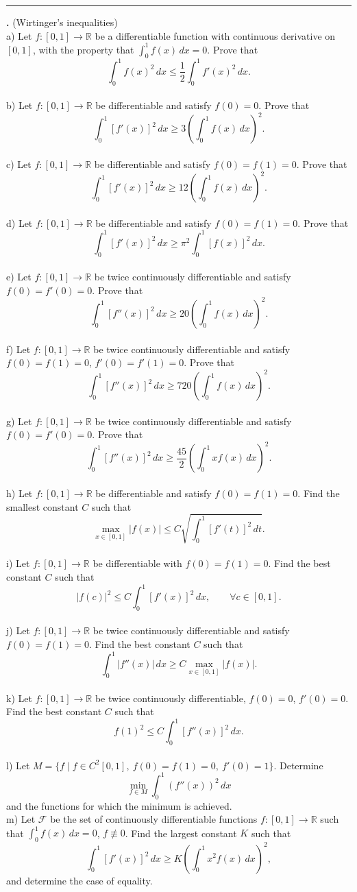 \documentclass[11pt]{article}
\newcounter{probnum}
\newenvironment{problembox}{\par\noindent\rule{\linewidth}{0.5pt}\vspace{5pt}\par}{\vspace{2pt}}
\begin{document}
\begin{problembox}
\textbf{\theprobnum.} (Wirtinger's inequalities)
\\
a) Let $f : [0,1] \to \mathbb{R}$ be a differentiable function with continuous derivative on $[0,1]$, with the property that $\displaystyle\int_0^1 f(x)\,dx = 0$. Prove that
\[
\int_0^1 f(x)^2\,dx \le \frac{1}{2} \int_0^1 f'(x)^2\,dx.
\]
\\
b) Let $f : [0,1] \to \mathbb{R}$ be differentiable and satisfy $f(0)=0$. Prove that
\[
\int_0^1 [f'(x)]^2\,dx \ge 3 \left(\int_0^1 f(x)\,dx\right)^2.
\]
\\
c) Let $f : [0,1] \to \mathbb{R}$ be differentiable and satisfy $f(0)=f(1)=0$. Prove that
\[
\int_0^1 [f'(x)]^2\,dx \ge 12 \left(\int_0^1 f(x)\,dx\right)^2.
\]
\\
d) Let $f : [0,1] \to \mathbb{R}$ be differentiable and satisfy $f(0)=f(1)=0$. Prove that
\[
\int_0^1 [f'(x)]^2\,dx \ge \pi^2 \int_0^1 [f(x)]^2\,dx.
\]
\\
e) Let $f : [0,1] \to \mathbb{R}$ be twice continuously differentiable and satisfy $f(0)=f'(0)=0$. Prove that
\[
\int_0^1 [f''(x)]^2\,dx \ge 20 \left(\int_0^1 f(x)\,dx\right)^2.
\]
\\
f) Let $f : [0,1] \to \mathbb{R}$ be twice continuously differentiable and satisfy $f(0)=f(1)=0$, $f'(0)=f'(1)=0$. Prove that
\[
\int_0^1 [f''(x)]^2\,dx \ge 720 \left(\int_0^1 f(x)\,dx\right)^2.
\]
\\
g) Let $f : [0,1] \to \mathbb{R}$ be twice continuously differentiable and satisfy $f(0)=f'(0)=0$. Prove that
\[
\int_0^1 [f''(x)]^2\,dx \ge \frac{45}{2} \left(\int_0^1 x f(x)\,dx\right)^2.
\]
\\
h) Let $f : [0,1] \to \mathbb{R}$ be differentiable and satisfy $f(0)=f(1)=0$. Find the smallest constant $C$ such that
\[
\max_{x \in [0,1]} |f(x)| \le C \sqrt{\int_0^1 [f'(t)]^2\,dt}.
\]
\\
i) Let $f : [0,1] \to \mathbb{R}$ be differentiable with $f(0)=f(1)=0$. Find the best constant $C$ such that
\[
|f(c)|^2 \le C \int_0^1 [f'(x)]^2\,dx, \qquad \forall c \in [0,1].
\]
\\
j) Let $f : [0,1] \to \mathbb{R}$ be twice continuously differentiable and satisfy $f(0)=f(1)=0$. Find the best constant $C$ such that
\[
\int_0^1 |f''(x)|\,dx \ge C \max_{x \in [0,1]} |f(x)|.
\]
\\
k) Let $f : [0,1] \to \mathbb{R}$ be twice continuously differentiable, $f(0)=0$, $f'(0)=0$. Find the best constant $C$ such that
\[
f(1)^2 \le C \int_0^1 [f''(x)]^2\,dx.
\]
\\
l) Let $M = \{f \mid f \in C^2[0,1],\ f(0)=f(1)=0,\ f'(0)=1\}$. Determine
\[
\min_{f \in M} \int_0^1 (f''(x))^2\,dx
\]
and the functions for which the minimum is achieved.\\
m) Let $\mathcal{F}$ be the set of continuously differentiable functions $f : [0,1] \to \mathbb{R}$ such that $\displaystyle\int_0^1 f(x)\,dx = 0$, $f \not\equiv 0$. Find the largest constant $K$ such that
\[
\int_0^1 [f'(x)]^2\,dx \ge K \left(\int_0^1 x^2 f(x)\,dx\right)^2,
\]
and determine the case of equality.
\end{problembox}
\end{document}
